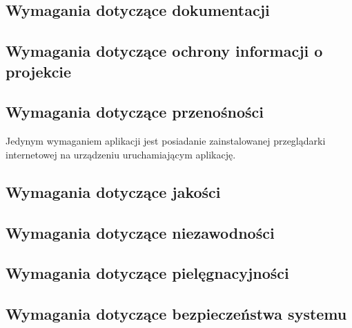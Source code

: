 \documentclass[12pt,a4paper]{report}
\begin{document}
\subsection{Wymagania dotyczące dokumentacji}
\subsection{Wymagania dotyczące ochrony informacji o projekcie}
\subsection{Wymagania dotyczące przenośności}
	Jedynym wymaganiem aplikacji jest posiadanie zainstalowanej przeglądarki internetowej na urządzeniu uruchamiającym aplikację.
\subsection{Wymagania dotyczące jakości}
\subsection{Wymagania dotyczące niezawodności}
\subsection{Wymagania dotyczące pielęgnacyjności}
\subsection{Wymagania dotyczące bezpieczeństwa systemu}
\end{document}
